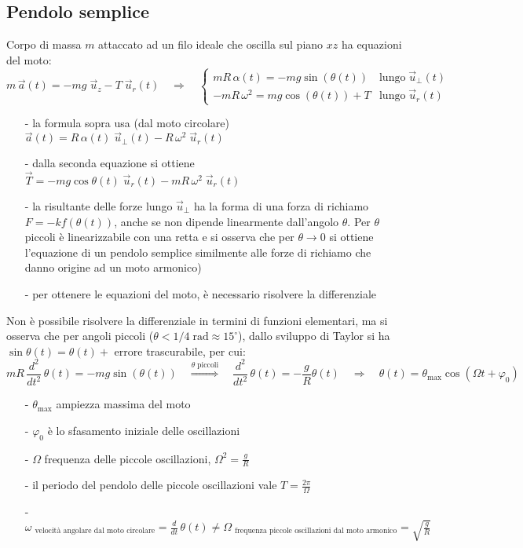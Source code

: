 \documentclass[a4paper]{article}
\newcommand\uz{\vec{u}_z}
\newcommand\ur{\vec{u}_r}
\newcommand\uper{\vec{u}_\perp}
\newcommand\dt{\frac{d}{dt}\,}
\newcommand\dts{\frac{d^2}{dt^2}\,}
\begin{document}
\subsection{Pendolo semplice}
Corpo di massa \(m\) attaccato ad un filo ideale che oscilla sul piano \(xz\) ha equazioni del moto:
\[m \, \vec{a}(t) = - mg \; \uz - T \; \ur(t) \quad \Rightarrow \quad \begin{cases}
	\displaystyle mR  \, \alpha(t) = -mg \sin (\theta(t)) &\text{lungo} \; \uper(t) \\
	\displaystyle -mR \, \omega^2 = mg \cos (\theta(t)) + T &\text{lungo} \; \ur(t)
\end{cases}\]
\begin{itemize}[topsep=3pt, itemsep=0pt]
	\item[-] la formula sopra usa (dal moto circolare) \(\vec{a}(t) = R \, \alpha(t) \; \uper(t) - R \, \omega^2 \; \ur(t)\)
	\item[-] dalla seconda equazione si ottiene \(\vec{T} = -mg \cos \theta(t) \; \ur(t) - mR \, \omega^2 \; \ur(t)\)
	\item[-] la risultante delle forze lungo \(\uper\) ha la forma di una forza di richiamo \(F = -k f(\theta(t))\), anche se non
	dipende linearmente dall'angolo \(\theta\). Per \(\theta\) piccoli è linearizzabile con una retta e si osserva che per \(\theta \to 0\)
	si ottiene l'equazione di un pendolo semplice similmente alle forze di richiamo che danno origine ad un moto armonico)
	\item[-] per ottenere le equazioni del moto, è necessario risolvere la differenziale
\end{itemize}
Non è possibile risolvere la differenziale in termini di funzioni elementari, ma si osserva che per angoli piccoli (\(\theta < 1/4 \; \text{rad} \approx 15^\circ\)),
dallo sviluppo di Taylor si ha \(\sin \theta(t) = \theta(t) + \!\) errore trascurabile, per cui:
\[mR  \, \dts \theta(t) = -mg \sin (\theta(t)) \quad \stackrel{\theta \; \text{piccoli}}{\Rightarrow} \quad \dts \theta(t) = -\frac{g}{R} \theta(t) \quad \Rightarrow \quad \theta(t) = \theta_\text{max} \cos(\Omega t + \varphi_0)\]
\begin{itemize}[topsep=3pt, itemsep=0pt]
	\item[-] \(\theta_\text{max}\) ampiezza massima del moto
	\item[-] \(\varphi_0\) è lo sfasamento iniziale delle oscillazioni
	\item[-] \(\Omega\) frequenza delle piccole oscillazioni, \(\displaystyle \Omega^2 = \frac{g}{R}\)
	\item[-] il periodo del pendolo delle piccole oscillazioni vale \(\displaystyle T = \frac{2\pi}{\Omega}\)
	\item[-] \(\omega \; _\text{velocità angolare dal moto circolare} = \dt \theta(t) \neq \Omega \; _\text{frequenza piccole oscillazioni dal moto armonico} = \sqrt{\frac{g}{R}}\)
\end{itemize}
\end{document}
